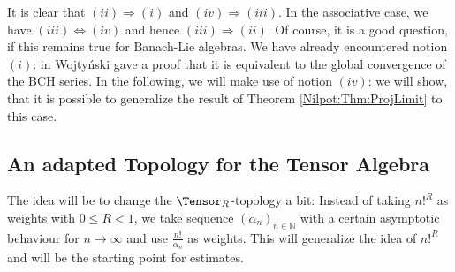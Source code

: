 It is clear that $(ii) \Rightarrow (i)$ and $(iv) \Rightarrow (iii)$. In the 
associative case, we have $(iii) \Leftrightarrow (iv)$ and hence $(iii) 
\Rightarrow (ii)$. Of course, it is a good question, if this remains true for 
Banach-Lie algebras. We have already encountered notion $(i)$: in 
\cite{wojtynski:1998a} Wojty\'nski gave a proof that it is equivalent to the 
global convergence of the BCH series. In the following, we will make use of notion 
$(iv)$: we will show, that it is possible to generalize the result of Theorem 
\ref{Nilpot:Thm:ProjLimit} to this case.



\subsection{An adapted Topology for the Tensor Algebra}

The idea will be to change the $\Tensor_R$-topology a bit: Instead of taking 
$n!^R$ as weights with $0 \leq R < 1$, we take sequence $(\alpha_n)_{n \in 
\mathbb{N}}$ with a certain asymptotic 
behaviour for $n \longrightarrow \infty$ and use $\frac{n!}{\alpha_n}$ as 
weights. This will generalize the idea of $n!^R$ and will be the starting point 
for estimates.

